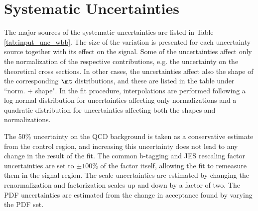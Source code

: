 \section{Systematic Uncertainties}
The major sources of the systematic uncertainties are listed in Table \ref{tab:input_unc_wbb}.
 The size of the variation is presented for each uncertainty source
 together with its effect
 on the signal.
Some of the uncertainties affect
 only the normalization of the respective contributions,
 e.g. the uncertainty on the
 theoretical cross sections.
In other cases, the uncertainties affect also the
 shape of the corresponding $\mt$ distributions,
 and these are listed in
 the table under ``norm. + shape".
In the fit procedure, interpolations are performed following a log
 normal distribution for uncertainties affecting only normalizations
 and a quadratic distribution for uncertainties affecting both the shapes and normalizations.

The 50\% uncertainty on the QCD background is taken as a conservative estimate from
 the control region, and increasing this uncertainty does not lead to any change
 in the result of the fit.
The common b-tagging and JES rescaling factor uncertainties
 are set to $\pm100\%$ of the factor itself, allowing the fit to
 remeasure them in the signal region.
The scale uncertainties are estimated by
 changing the renormalization and factorization scales
 up and down by a factor of two.
The PDF uncertainties are estimated from the change in
 acceptance found by varying the
 PDF set.

